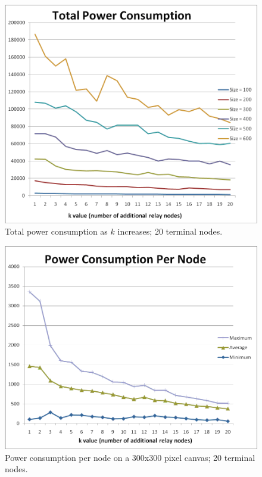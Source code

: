 \begin{figure}[htp]
\centering
\includegraphics[scale=0.375]{images/6.PNG}
\caption{Total power consumption as $k$ increases; 20 terminal nodes.}
\label{6}
\end{figure}

\begin{figure}[htp]
\centering
\includegraphics[scale=0.385]{images/7.PNG}
\caption{Power consumption per node on a 300x300 pixel canvas; 20 terminal nodes.}
\label{7}
\end{figure}
